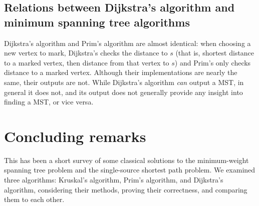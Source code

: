 \documentclass[11pt]{article}
\begin{document}
\subsection{Relations between Dijkstra's algorithm and minimum spanning tree algorithms}
Dijkstra's algorithm and Prim's algorithm are almost identical: when choosing a
new vertex to mark, Dijkstra's checks the distance to $s$ (that is, shortest
distance to a marked vertex, then distance from that vertex to $s$) and
Prim's only checks distance to a marked vertex. Although their implementations are
nearly the same, their outputs are not. While Dijkstra's algorithm \textit{can}
output a MST, in general it does not, and its output does not generally provide
any insight into finding a MST, or vice versa.


\section{Concluding remarks}
This has been a short survey of some classical solutions to the minimum-weight
spanning tree problem and the single-source shortest path problem. We examined
three algorithms: Kruskal's algorithm, Prim's algorithm, and Dijkstra's
algorithm, considering their methods, proving their correctness, and comparing
them to each other.




\end{document}
